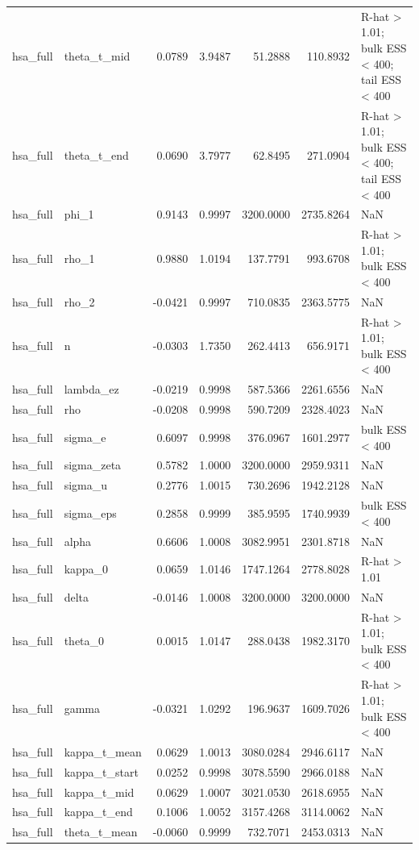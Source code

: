 \begin{tabular}{llrrrrl}
hsa\_full & theta\_t\_mid & 0.0789 & 3.9487 & 51.2888 & 110.8932 & R-hat > 1.01; bulk ESS < 400; tail ESS < 400 \\
hsa\_full & theta\_t\_end & 0.0690 & 3.7977 & 62.8495 & 271.0904 & R-hat > 1.01; bulk ESS < 400; tail ESS < 400 \\
hsa\_full & phi\_1 & 0.9143 & 0.9997 & 3200.0000 & 2735.8264 & NaN \\
hsa\_full & rho\_1 & 0.9880 & 1.0194 & 137.7791 & 993.6708 & R-hat > 1.01; bulk ESS < 400 \\
hsa\_full & rho\_2 & -0.0421 & 0.9997 & 710.0835 & 2363.5775 & NaN \\
hsa\_full & n & -0.0303 & 1.7350 & 262.4413 & 656.9171 & R-hat > 1.01; bulk ESS < 400 \\
hsa\_full & lambda\_ez & -0.0219 & 0.9998 & 587.5366 & 2261.6556 & NaN \\
hsa\_full & rho & -0.0208 & 0.9998 & 590.7209 & 2328.4023 & NaN \\
hsa\_full & sigma\_e & 0.6097 & 0.9998 & 376.0967 & 1601.2977 & bulk ESS < 400 \\
hsa\_full & sigma\_zeta & 0.5782 & 1.0000 & 3200.0000 & 2959.9311 & NaN \\
hsa\_full & sigma\_u & 0.2776 & 1.0015 & 730.2696 & 1942.2128 & NaN \\
hsa\_full & sigma\_eps & 0.2858 & 0.9999 & 385.9595 & 1740.9939 & bulk ESS < 400 \\
hsa\_full & alpha & 0.6606 & 1.0008 & 3082.9951 & 2301.8718 & NaN \\
hsa\_full & kappa\_0 & 0.0659 & 1.0146 & 1747.1264 & 2778.8028 & R-hat > 1.01 \\
hsa\_full & delta & -0.0146 & 1.0008 & 3200.0000 & 3200.0000 & NaN \\
hsa\_full & theta\_0 & 0.0015 & 1.0147 & 288.0438 & 1982.3170 & R-hat > 1.01; bulk ESS < 400 \\
hsa\_full & gamma & -0.0321 & 1.0292 & 196.9637 & 1609.7026 & R-hat > 1.01; bulk ESS < 400 \\
hsa\_full & kappa\_t\_mean & 0.0629 & 1.0013 & 3080.0284 & 2946.6117 & NaN \\
hsa\_full & kappa\_t\_start & 0.0252 & 0.9998 & 3078.5590 & 2966.0188 & NaN \\
hsa\_full & kappa\_t\_mid & 0.0629 & 1.0007 & 3021.0530 & 2618.6955 & NaN \\
hsa\_full & kappa\_t\_end & 0.1006 & 1.0052 & 3157.4268 & 3114.0062 & NaN \\
hsa\_full & theta\_t\_mean & -0.0060 & 0.9999 & 732.7071 & 2453.0313 & NaN \\

\end{tabular}
